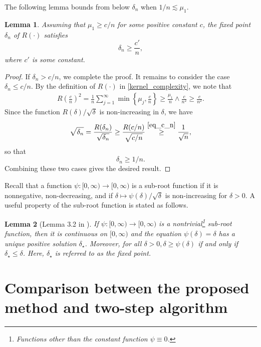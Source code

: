 \documentclass[11pt,twoside]{article}
\newtheorem{lemma}{Lemma}
\def\i{\infty}
\def\l{\left}
\def\r{\right}
\begin{document}
The following lemma bounds from below $\delta_n$ when $ 1/n \lesssim  \mu_1$.

\begin{lemma}\label{lem_lb_delta_n}
Assuming  that $\mu_1 \ge c/n$ for some positive constant $c$, the fixed point $\delta_n$ of $R(\cdot)$ satisfies
\[
    \delta_n   \ge \frac{c'}{n} , 
    \]
    where $c'$ is some constant. 
\end{lemma}
\begin{proof}
If $\delta_n > c/n$, we complete the proof. It remains to consider the case $\delta_n \le c/n$. 
By the definition of 
$R(\cdot)$ in 
\cref{kernel_complexity}, we note that
\begin{align}\label{eq_c_n}
        R\l(\frac{c}{n}\r)^2  =   \frac{1}{n} \sum_{j=1}^\infty 
        \min \l\{\mu_j,\frac{c}{n}\r\}  \ge   \frac{\mu_1}{n}  \wedge  \frac{c}{n^2}  \ge \frac{c}{n^2}.
    \end{align}
Since the function $R(\delta)/\sqrt{\delta}$ is non-increasing in $\delta$, we have 
    \[
    \sqrt{\delta_n}  = \frac{R(\delta_n)}{ \sqrt{\delta_n}} \ge  \frac{R(c/n)}{ \sqrt{c/n}} \overset{\eqref{eq_c_n}}{\ge}\frac{1}{\sqrt{n}}, 
    \]
    so that
    \[
   \delta_n\ge 1/n. 
    \]
    Combining these two cases gives the desired result.    
\end{proof}




Recall that
a function $\psi: [0,\i)\to  [0,\i)$ is a sub-root function if it is nonnegative, non-decreasing, and if $\delta\mapsto \psi(\delta)/\sqrt{\delta}$ is non-increasing for $\delta>0$.
A useful property of the sub-root function  
is stated as follows. 

\begin{lemma}[Lemma 3.2 in \cite{bartlett2005local}]\label{lem_subroot_monotone}
If $\psi:[0, \infty) \to [0, \infty)$ is a nontrivial\footnote{Functions other than the constant function $\psi\equiv 0$. } 
sub-root function, 
then it is continuous on $[0, \infty)$ and the equation $\psi(\delta)=\delta$ has a unique positive solution $\delta_\star$. Moreover, for all $\delta>0, \delta\geq \psi(\delta)$ if and only if $\delta_\star \leq \delta$. Here, $\delta_\star$ is referred to as the fixed point. 
\end{lemma}


 \section{Comparison between the proposed method and two-step algorithm}\label{app_comp_two}
\end{document}
